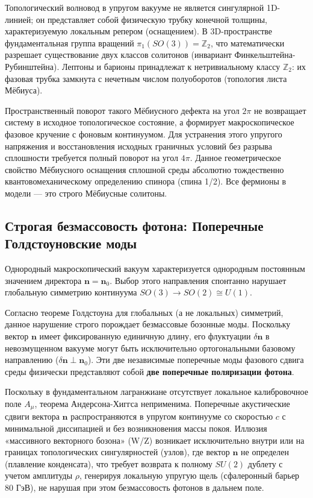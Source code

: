 \documentclass[11pt,a4paper]{article}
\begin{document}
Топологический волновод в упругом вакууме не является сингулярной 1D-линией; он представляет собой физическую трубку конечной толщины, характеризуемую локальным репером (оснащением). В 3D-пространстве фундаментальная группа вращений $\pi_1(SO(3)) = \mathbb{Z}_2$, что математически разрешает существование двух классов солитонов (инвариант Финкельштейна-\\Рубинштейна).
Лептоны и барионы принадлежат к нетривиальному классу $\mathbb{Z}_2$: их фазовая трубка замкнута с нечетным числом полуоборотов (топология листа Мёбиуса). 

Пространственный поворот такого Мёбиусного дефекта на угол $2\pi$ не возвращает систему в исходное топологическое состояние, а формирует макроскопическое фазовое кручение с фоновым континуумом. Для устранения этого упругого напряжения и восстановления исходных граничных условий без разрыва сплошности требуется полный поворот на угол $4\pi$. Данное геометрическое свойство Мёбиусного оснащения сплошной среды абсолютно тождественно квантовомеханическому определению спинора (спина 1/2). Все фермионы в модели — это строго Мёбиусные солитоны.

\subsection{Строгая безмассовость фотона: Поперечные Голдстоуновские моды}
Однородный макроскопический вакуум характеризуется однородным постоянным значением директора $\mathbf{n} = \mathbf{n}_0$. Выбор этого направления спонтанно нарушает глобальную симметрию континуума $SO(3) \to SO(2) \cong U(1)$. 

Согласно теореме Голдстоуна для глобальных (а не локальных) симметрий, данное нарушение строго порождает безмассовые бозонные моды. Поскольку вектор $\mathbf{n}$ имеет фиксированную единичную длину, его флуктуации $\delta \mathbf{n}$ в невозмущенном вакууме могут быть исключительно ортогональными базовому направлению ($\delta \mathbf{n} \perp \mathbf{n}_0$). 
Эти две независимые поперечные моды фазового сдвига среды физически представляют собой \textbf{две поперечные поляризации фотона}. 

Поскольку в фундаментальном лагранжиане отсутствует локальное калибровочное поле $A_\mu$, теорема Андерсона-Хиггса неприменима. Поперечные акустические сдвиги вектора $\mathbf{n}$ распространяются в упругом континууме со скоростью $c$ с минимальной диссипацией и без возникновения массы покоя. 
Иллюзия «массивного векторного бозона» (W/Z) возникает исключительно внутри или на границах топологических сингулярностей (узлов), где вектор $\mathbf{n}$ не определен (плавление конденсата), что требует возврата к полному $SU(2)$ дублету с учетом амплитуды $\rho$, генерируя локальную упругую щель (сфалеронный барьер $80$ ГэВ), не нарушая при этом безмассовость фотонов в дальнем поле.
	
\end{document}
